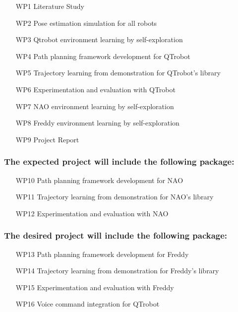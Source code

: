 \documentclass[thesis]{mas_proposal}
\begin{document}
		\begin{enumerate}
		    \item[WP1] Literature Study
		    \item[WP2] Pose estimation simulation for all robots
		    \item[WP3] Qtrobot environment learning by self-exploration
		    \item[WP4] Path planning framework development for QTrobot
		    \item[WP5] Trajectory learning from demonstration for QTrobot's library
		    \item[WP6] Experimentation and evaluation with QTrobot
		    \item[WP7] NAO environment learning by self-exploration
		    \item[WP8] Freddy environment learning by self-exploration
		    \item[WP9] Project Report
		\end{enumerate}
	
	\subsubsection{The expected project will include the following package:}
	
		\begin{enumerate}
		    \item[WP10] Path planning framework development for NAO
			\item[WP11] Trajectory learning from demonstration for NAO's library
			\item[WP12] Experimentation and evaluation with NAO
		\end{enumerate}
	
	\subsubsection{The desired project will include the following package:}
	
		\begin{enumerate}
			\item[WP13] Path planning framework development for Freddy
			\item[WP14] Trajectory learning from demonstration for Freddy's library
			\item[WP15] Experimentation and evaluation with Freddy
			\item[WP16] Voice command integration for QTrobot 
		\end{enumerate}
	
\end{document}
